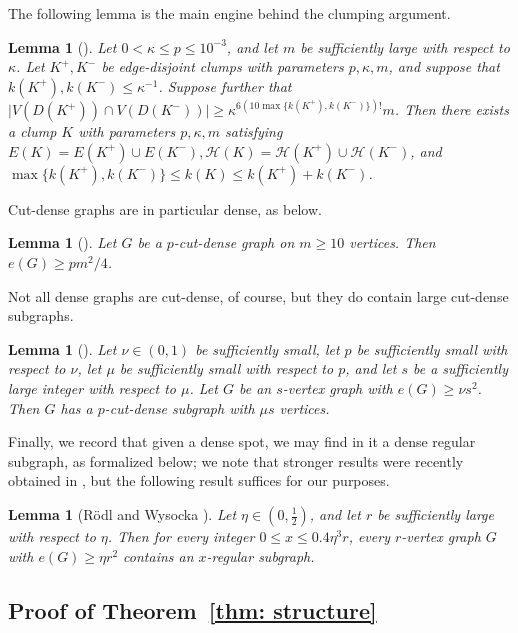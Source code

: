 \documentclass[10pt]{article}
\newtheorem{lemma}[theorem]{Lemma}
\theoremstyle{definition}
\newcommand\ab[1]{\lvert#1\rvert}
\let\leq\leqslant
\let\geq\geqslant
\begin{document}
The following lemma is the main engine behind the clumping argument.

\begin{lemma}[{\cite[Lemma 4.9]{alexey}}]\label{pok4.9}
    Let $0 <\kappa \leq p \leq 10^{-3}$, and let $m$ be sufficiently large with respect to $\kappa$. Let $K^+,K^-$ be edge-disjoint clumps with parameters $p,\kappa,m$, and suppose that $k(K^+),k(K^-)\leq \kappa^{-1}$. Suppose further that $\ab{V(D(K^+)) \cap V(D(K^-))}\geq \kappa^{6(10\max\{k(K^+),k(K^-)\})!}m$. Then there exists a clump $K$ with parameters $p,\kappa,m$ satisfying $E(K) = E(K^+)\cup E(K^-), \mathcal H(K) = \mathcal H(K^+)\cup \mathcal H(K^-)$, and $\max\{k(K^+),k(K^-)\} \leq k(K) \leq k(K^+)+k(K^-)$. 
\end{lemma}

Cut-dense graphs are in particular dense, as 
below.
\begin{lemma}[{\cite[Fact 3.6]{alexey}}]\label{pok3.6}
    Let $G$ be a $p$-cut-dense graph on $m\geq 10$ vertices. Then $e(G) \geq pm^2/4$. 
\end{lemma}
Not all dense graphs are cut-dense, of course, but they do contain large cut-dense subgraphs.
\begin{lemma}[{\cite[Lemma 3.14]{alexey}}]\label{pok3.14}
    Let $\nu \in (0,1)$ be sufficiently small, let $p$ be sufficiently small with respect to $\nu$, let $\mu$ be sufficiently small with respect to $p$, and let $s$ be a sufficiently large integer with respect to $\mu$. Let $G$ be an $s$-vertex graph with $e(G) \geq \nu s^2$. Then $G$ has a $p$-cut-dense subgraph with $\mu s$ vertices. 
\end{lemma}

Finally, we record that given a dense spot, we may find in it a dense regular subgraph, as formalized below; we note that stronger results were recently obtained in \cite{chakraborti_regular}, but the following result suffices for our purposes.

\begin{lemma}[{R\"odl and Wysocka \cite{rodl1997note}}]\label{pok4.5}
    Let $\eta \in (0,\frac 12)$, and let $r$ be sufficiently large with respect to $\eta$. Then for every integer $0 \leq x \leq 0.4 \eta^3 r$, every $r$-vertex graph $G$ with $e(G)\geq \eta r^2$ contains an $x$-regular subgraph.
\end{lemma}


\subsection{Proof of Theorem~\ref{thm: structure}}
\end{document}
